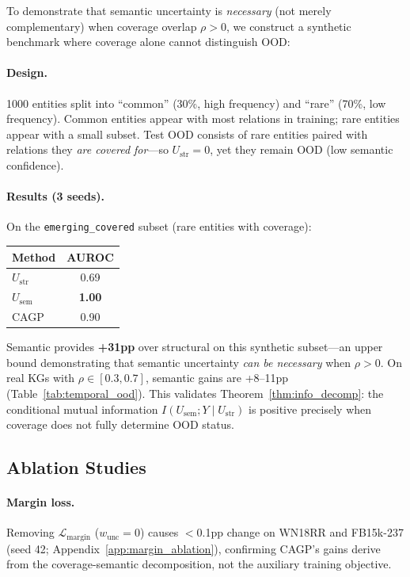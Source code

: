 To demonstrate that semantic uncertainty is \emph{necessary} (not merely complementary) when coverage overlap $\rho > 0$, we construct a synthetic benchmark where coverage alone cannot distinguish OOD:

\paragraph{Design.} 1000 entities split into ``common'' (30\%, high frequency) and ``rare'' (70\%, low frequency). Common entities appear with most relations in training; rare entities appear with a small subset. Test OOD consists of rare entities paired with relations they \emph{are covered for}---so $U_{\text{str}} = 0$, yet they remain OOD (low semantic confidence).

\paragraph{Results (3 seeds).} On the \texttt{emerging\_covered} subset (rare entities with coverage):
\begin{center}
\small
\begin{tabular}{lc}
\toprule
Method & AUROC \\
\midrule
$U_{\text{str}}$ & 0.69 \\
$U_{\text{sem}}$ & \textbf{1.00} \\
CAGP & 0.90 \\
\bottomrule
\end{tabular}
\end{center}

Semantic provides \textbf{+31pp} over structural on this synthetic subset---an upper bound demonstrating that semantic uncertainty \emph{can be necessary} when $\rho > 0$. On real KGs with $\rho \in [0.3, 0.7]$, semantic gains are +8--11pp (Table~\ref{tab:temporal_ood}). This validates Theorem~\ref{thm:info_decomp}: the conditional mutual information $I(U_{\text{sem}}; Y \mid U_{\text{str}})$ is positive precisely when coverage does not fully determine OOD status.

\subsection{Ablation Studies}
\label{sec:ablations}

\paragraph{Margin loss.}
Removing $\mathcal{L}_{\text{margin}}$ ($w_{\text{unc}}{=}0$) causes $<$0.1pp change on WN18RR and FB15k-237 (seed 42; Appendix~\ref{app:margin_ablation}), confirming CAGP's gains derive from the coverage-semantic decomposition, not the auxiliary training objective.

